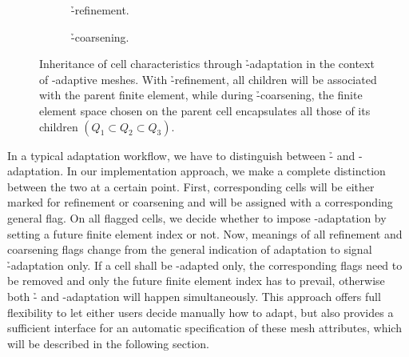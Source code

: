 \begin{figure}
\begin{subfigure}{.5\textwidth}
  \centering
  
  \caption{\h-refinement.}
\end{subfigure}
\begin{subfigure}{.5\textwidth}
  \centering
  
  \caption{\h-coarsening.}
\end{subfigure}
\caption[Inheritance of cell characteristics through \h-adaptation.]{Inheritance of cell characteristics through \h-adaptation in the context of \hp-adaptive meshes. With \h-refinement, all children will be associated with the parent finite element, while during \h-coarsening, the finite element space chosen on the parent cell encapsulates all those of its children $(Q_1 \subset Q_2 \subset Q_3)$.}
\label{fig:adaptation}
\end{figure}

In a typical adaptation workflow, we have to distinguish between \h- and \p-adaptation. In our implementation approach, we make a complete distinction between the two at a certain point. First, corresponding cells will be either marked for refinement or coarsening and will be assigned with a corresponding general flag. On all flagged cells, we decide whether to impose \p-adaptation by setting a future finite element index or not. Now, meanings of all refinement and coarsening flags change from the general indication of adaptation to signal \h-adaptation only. If a cell shall be \p-adapted only, the corresponding flags need to be removed and only the future finite element index has to prevail, otherwise both \h- and \p-adaptation will happen simultaneously. This approach offers full flexibility to let either users decide manually how to adapt, but also provides a sufficient interface for an automatic specification of these mesh attributes, which will be described in the following section.
